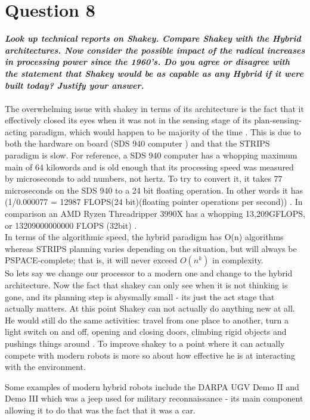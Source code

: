 \documentclass{article}
\newcommand\tab[1][1cm]{\hspace*{#1}}
\begin{document}
\section*{Question 8}
\textbf{\textit{
    \tab Look up technical reports on Shakey. Compare Shakey with the Hybrid
architectures.  Now  consider  the  possible  impact  of the  radical  increases  in
 processing power since the 1960’s. Do you agree or disagree with the statement that
Shakey would be as capable as any Hybrid if it were built today? Justify your answer.
}} \\ \\
The overwhelming issue with shakey in terms of its architecture is the fact that it effectively closed its eyes when it was not in
the sensing stage of its plan-sensing-acting paradigm, which would happen to be majority of the time \cite{IntroToAI}. This is due 
to both the hardware on board (SDS 940 computer \cite{shakey}) and that the STRIPS paradigm is slow. For reference, a SDS 940 computer
has a whopping maximum main of 64 kilowords and is old enough that its processing speed was 
measured by microseconds to add numbers, not hertz. 
To try to convert it, it takes 77 microseconds on the SDS 940 to a 24 bit floating operation. 
In other words it has (1/0.000077 = 12987 FLOPS(24 bit)(floating pointer operations per second)) \cite{SDS940}. 
In comparison an AMD Ryzen Threadripper 3990X has a whopping 13,209GFLOPS, or 13209000000000 FLOPS (32bit) \cite{threadripper}. \\

\tab In terms of the algorithmic speed, the hybrid paradigm has O(n) algorithms \cite{IntroToAI} 
whereas STRIPS planning varies depending on the situation, but will always be 
PSPACE-complete; that is, it will never exceed $O(n^k)$ in complexity. \\

\tab So lets say we change our processor to a modern one and change to the hybrid architecture. Now the fact that 
shakey can only see when it is not thinking is gone, and its planning step is abysmally small - its just the act
stage that actually matters. At this point Shakey can not actually do anything new at all. He would still
do the same activities: travel from one place to another, turn a light switch on and off, opening and closing doors, 
climbing rigid objects and pushings things around \cite{shakey}. To improve shakey to a point where it can actually
compete with modern robots is more so about how effective he is at interacting with the environment.

\tab Some examples of modern hybrid robots include the DARPA UGV Demo II and Demo III which was a jeep used
for military reconnaissance - its main component allowing it to do that was the fact that it was a car. 


\end{document}
